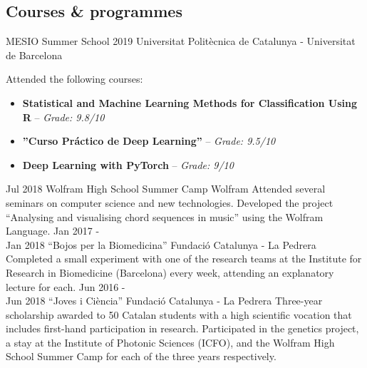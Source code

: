 \documentclass[]{resume}
\begin{document}
\begin{adjustwidth}{10pt}{10pt}
\section*{Courses \& programmes}

\renewcommand{\twentylen}{\itemwidth}
\begin{twenty}[\chronowidth]
    {MESIO Summer School 2019}
    {Universitat Politècnica de Catalunya - Universitat de Barcelona}
    {Attended the following courses:
     \begin{itemize}
         \item \textbf{Statistical and Machine Learning Methods for Classification Using R} -- \textit{Grade: 9.8/10}
         \item \textbf{''Curso Práctico de Deep Learning''} --  \textit{Grade: 9.5/10}
         \item \textbf{Deep Learning with PyTorch} --  \textit{Grade: 9/10}
     \end{itemize}
    }
    \twentyitem
    {Jul 2018}
    {Wolfram High School Summer Camp}
    {Wolfram}
    {Attended several seminars on computer science and new technologies. Developed the project ``Analysing and visualising chord sequences in music'' using the Wolfram Language.} %
    \twentyitem
    {Jan 2017 - \\ Jan 2018}
    {``Bojos per la Biomedicina''}
    {Fundació Catalunya - La Pedrera}
    {Completed a small experiment with one of the research teams at the Institute for Research in Biomedicine (Barcelona) every week, attending an explanatory lecture for each.}
    \twentyitem
    {Jun 2016 - \\ Jun 2018}
    {``Joves i Ciència''}
    {Fundació Catalunya - La Pedrera}
    {Three-year scholarship awarded to 50 Catalan students with a high scientific vocation that includes first-hand participation in research. Participated in the genetics project, a stay at the Institute of Photonic Sciences (ICFO), and the Wolfram High School Summer Camp for each of the three years respectively.}
\end{twenty}


\end{adjustwidth}

\end{document}
